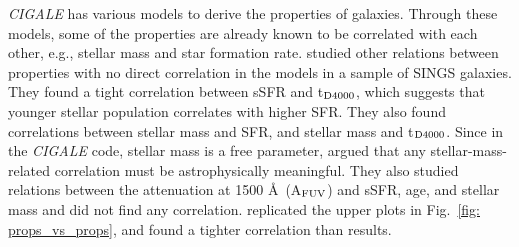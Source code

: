         {\em CIGALE} has various models to derive the properties of galaxies.
        Through these models, some of the properties are already known to be correlated with each other, e.g., stellar mass and star formation rate.
         studied other relations between properties with no direct correlation in the models in a sample of SINGS galaxies.
        They found a tight correlation between sSFR and t$_{\rm {D4000}}$, which suggests that younger stellar population correlates with higher SFR.
        They also found correlations between stellar mass and SFR, and stellar mass and t$_{\rm {D4000}}$.
        Since in the {\em CIGALE} code, stellar mass is a free parameter,  argued that any stellar-mass-related correlation must be astrophysically meaningful. 
        They also studied relations between the attenuation at 1500 \AA~(A$_{\rm {FUV}}$) and sSFR, age, and stellar mass and did not find any correlation.
         replicated the upper plots in Fig.~\ref{fig: props_vs_props}, and found a tighter correlation than  results. 
        
